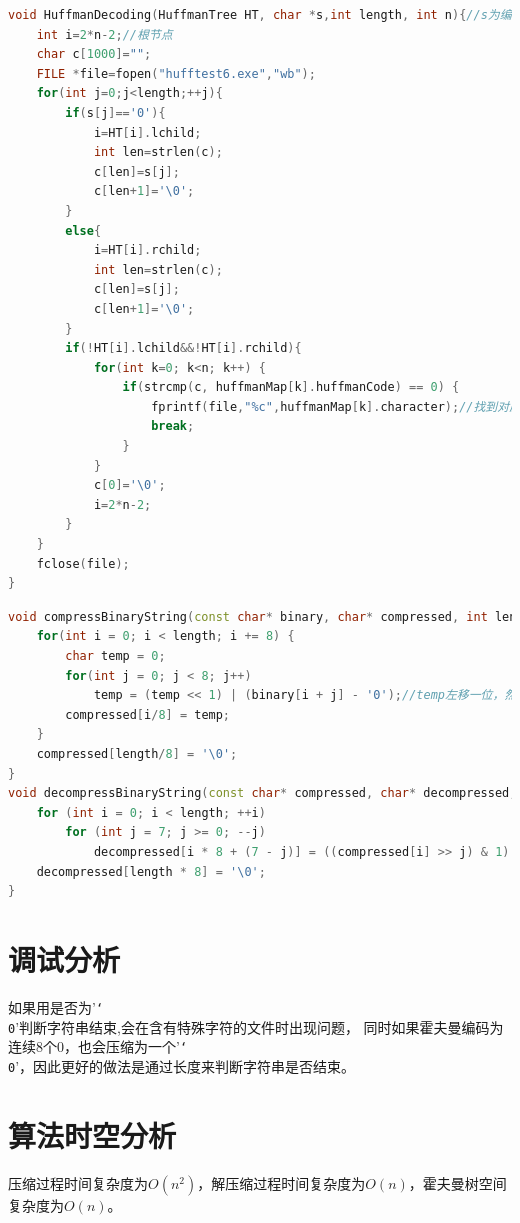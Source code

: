 \documentclass{ctexart}
\begin{document}
\begin{lstlisting}[language=C++, caption=把编码后的01字符串解码为原字符串]
	void HuffmanDecoding(HuffmanTree HT, char *s,int length, int n){//s为编码后的字符串,本函数把编码后的01字符串解码为原字符串
    int i=2*n-2;//根节点
    char c[1000]="";
    FILE *file=fopen("hufftest6.exe","wb");
    for(int j=0;j<length;++j){
        if(s[j]=='0'){
            i=HT[i].lchild;
            int len=strlen(c);
            c[len]=s[j];
            c[len+1]='\0';
        }
        else{
            i=HT[i].rchild;
            int len=strlen(c);
            c[len]=s[j];
            c[len+1]='\0';
        }
        if(!HT[i].lchild&&!HT[i].rchild){
            for(int k=0; k<n; k++) {
                if(strcmp(c, huffmanMap[k].huffmanCode) == 0) {
                    fprintf(file,"%c",huffmanMap[k].character);//找到对应的字符并写入新文件
                    break;
                }
            }
            c[0]='\0';
            i=2*n-2;
        }
    }
    fclose(file);
}
\end{lstlisting}
\begin{lstlisting}[language=C++, caption=压缩与解压缩]
	void compressBinaryString(const char* binary, char* compressed, int length){//通过位运算把长为八个字节的01字符串压缩为一个字节（八位）
    for(int i = 0; i < length; i += 8) {
        char temp = 0;
        for(int j = 0; j < 8; j++) 
            temp = (temp << 1) | (binary[i + j] - '0');//temp左移一位，然后将binary[i + j] - '0'的结果（0或1）与temp进行或运算
        compressed[i/8] = temp;
    }
    compressed[length/8] = '\0';
}
void decompressBinaryString(const char* compressed, char* decompressed, int length){//通过位运算把一个字节（八位）还原长为八个字节的01字符串
	for (int i = 0; i < length; ++i) 
		for (int j = 7; j >= 0; --j) 
		    decompressed[i * 8 + (7 - j)] = ((compressed[i] >> j) & 1) + '0';//将compressed[i]右移j位，然后与1进行与运算
	decompressed[length * 8] = '\0';
}
\end{lstlisting}

	\section{调试分析}
    如果用是否为'\texttt{\char`\\0}'判断字符串结束,会在含有特殊字符的文件时出现问题，
    同时如果霍夫曼编码为连续8个0，也会压缩为一个'\texttt{\char`\\0}'，因此更好的做法是通过长度来判断字符串是否结束。

	\section{算法时空分析}
压缩过程时间复杂度为$O(n^2)$，解压缩过程时间复杂度为$O(n)$，霍夫曼树空间复杂度为$O(n)$。
\end{document}
